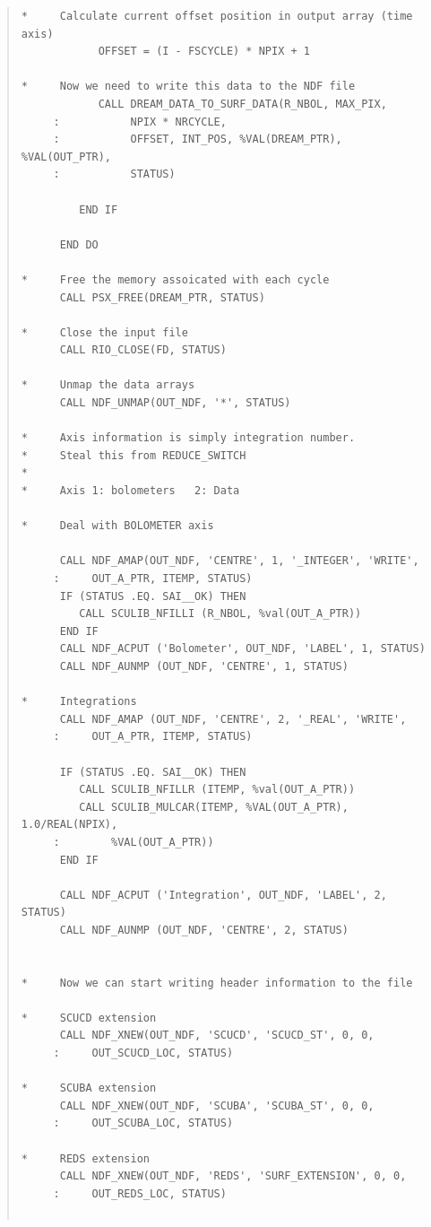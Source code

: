 \documentclass[twoside,11pt]{article}
\newenvironment{myquote}{\begin{quote}\begin{small}}{\end{small}\end{quote}}
\renewcommand{\_}{\texttt{\symbol{95}}}
\begin{document}
\begin{myquote}
\begin{verbatim}
*     Calculate current offset position in output array (time axis)
            OFFSET = (I - FSCYCLE) * NPIX + 1

*     Now we need to write this data to the NDF file
            CALL DREAM_DATA_TO_SURF_DATA(R_NBOL, MAX_PIX,
     :           NPIX * NRCYCLE,
     :           OFFSET, INT_POS, %VAL(DREAM_PTR), %VAL(OUT_PTR),
     :           STATUS)

         END IF

      END DO

*     Free the memory assoicated with each cycle
      CALL PSX_FREE(DREAM_PTR, STATUS)

*     Close the input file
      CALL RIO_CLOSE(FD, STATUS)

*     Unmap the data arrays
      CALL NDF_UNMAP(OUT_NDF, '*', STATUS)

*     Axis information is simply integration number.
*     Steal this from REDUCE_SWITCH
*
*     Axis 1: bolometers   2: Data

*     Deal with BOLOMETER axis
 
      CALL NDF_AMAP(OUT_NDF, 'CENTRE', 1, '_INTEGER', 'WRITE',
     :     OUT_A_PTR, ITEMP, STATUS)
      IF (STATUS .EQ. SAI__OK) THEN
         CALL SCULIB_NFILLI (R_NBOL, %val(OUT_A_PTR))
      END IF
      CALL NDF_ACPUT ('Bolometer', OUT_NDF, 'LABEL', 1, STATUS)
      CALL NDF_AUNMP (OUT_NDF, 'CENTRE', 1, STATUS)

*     Integrations
      CALL NDF_AMAP (OUT_NDF, 'CENTRE', 2, '_REAL', 'WRITE',
     :     OUT_A_PTR, ITEMP, STATUS)
 
      IF (STATUS .EQ. SAI__OK) THEN
         CALL SCULIB_NFILLR (ITEMP, %val(OUT_A_PTR))
         CALL SCULIB_MULCAR(ITEMP, %VAL(OUT_A_PTR), 1.0/REAL(NPIX),
     :        %VAL(OUT_A_PTR))
      END IF

      CALL NDF_ACPUT ('Integration', OUT_NDF, 'LABEL', 2, STATUS)
      CALL NDF_AUNMP (OUT_NDF, 'CENTRE', 2, STATUS)


*     Now we can start writing header information to the file

*     SCUCD extension
      CALL NDF_XNEW(OUT_NDF, 'SCUCD', 'SCUCD_ST', 0, 0,
     :     OUT_SCUCD_LOC, STATUS)

*     SCUBA extension
      CALL NDF_XNEW(OUT_NDF, 'SCUBA', 'SCUBA_ST', 0, 0,
     :     OUT_SCUBA_LOC, STATUS)

*     REDS extension
      CALL NDF_XNEW(OUT_NDF, 'REDS', 'SURF_EXTENSION', 0, 0,
     :     OUT_REDS_LOC, STATUS)


\end{verbatim}
\end{myquote}
\end{document}
